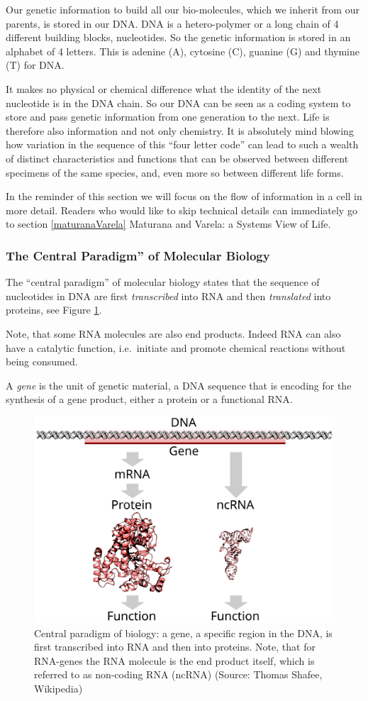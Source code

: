 \documentclass[
  11pt,
]{book}
\begin{document}
Our genetic information to build all our bio-molecules, which we inherit from our parents, is stored in our DNA. DNA is a hetero-polymer or a long chain of 4 different building blocks, nucleotides. So the genetic information is stored in an alphabet of 4 letters. This is
adenine (A), cytosine (C), guanine (G) and thymine (T) for DNA.

It makes no physical or chemical difference what the identity of the next nucleotide is in the DNA chain. So our DNA can be seen as a coding system to store and pass genetic information from one generation to the next. Life is therefore also information and not only chemistry. It is absolutely mind blowing how variation in the sequence of this ``four letter code'' can lead to such a wealth of distinct characteristics and functions that can be observed between different specimens of the same species, and, even more so between different life forms.

In the reminder of this section we will focus on the flow of information in a cell in more detail. Readers who would like to skip technical details can immediately go to section \ref{maturanaVarela} Maturana and Varela: a Systems View of Life.

\hypertarget{the-central-paradigm-of-molecular-biology}{%
\subsubsection{The Central Paradigm'' of Molecular Biology}\label{the-central-paradigm-of-molecular-biology}}

The ``central paradigm'' of molecular biology states that the sequence of nucleotides in DNA are first \emph{transcribed} into RNA and then \emph{translated} into proteins, see Figure \ref{fig:centralParadigm}.

Note, that some RNA molecules are also end products. Indeed RNA can also have a catalytic function, i.e.~initiate and promote chemical reactions without being consumed.

A \emph{gene} is the unit of genetic material, a DNA sequence that is encoding for the synthesis of a gene product, either a protein or a functional RNA.

\begin{figure}

{\centering \includegraphics[width=0.5\linewidth]{./figs/gene} 

}

\caption{Central paradigm of biology: a gene, a specific region in the DNA, is first transcribed into RNA and then into proteins. Note, that for RNA-genes the RNA molecule is the end product itself, which is referred to as non-coding RNA (ncRNA) (Source: Thomas Shafee, Wikipedia)}\label{fig:centralParadigm}
\end{figure}
\end{document}
